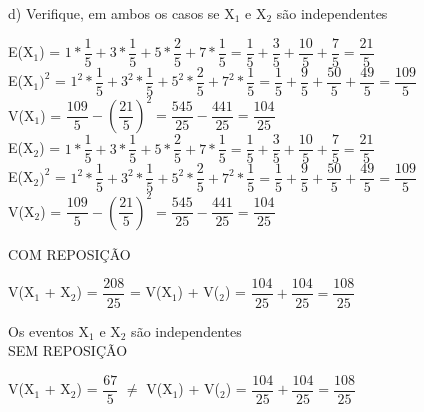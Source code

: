 \documentclass[12pt,a4paper,draft,final,oneside]{article}
\begin{document}
	\vspace{1cm}
	d) Verifique, em ambos os casos se X$_{1}$ e X$_{2}$ são independentes
	\vspace{0.5cm}\\
	\begin{center}
		E(X$_{1}$) = $1*\dfrac{1}{5} + 3*\dfrac{1}{5} + 5*\dfrac{2}{5} + 7*\dfrac{1}{5} = \dfrac{1}{5} + \dfrac{3}{5} + \dfrac{10}{5}
		+ \dfrac{7}{5} = \dfrac{21}{5}$
		\vspace{0.5cm}\\
		E(X$_{1})^2$ = $1^2*\dfrac{1}{5} + 3^2*\dfrac{1}{5} + 5^2*\dfrac{2}{5} + 7^2*\dfrac{1}{5} = \dfrac{1}{5} + \dfrac{9}{5} + \dfrac{50}{5} + \dfrac{49}{5} = \dfrac{109}{5}$
		\vspace{0.5cm}\\
		V(X$_{1}$) = $\dfrac{109}{5} - (\dfrac{21}{5})^2 = \dfrac{545}{25} - \dfrac{441}{25} = \dfrac{104}{25}$
		\vspace{1cm}\\
		E(X$_{2}$) = $1*\dfrac{1}{5} + 3*\dfrac{1}{5} + 5*\dfrac{2}{5} + 7*\dfrac{1}{5} = \dfrac{1}{5} + \dfrac{3}{5} + \dfrac{10}{5}
		+ \dfrac{7}{5} = \dfrac{21}{5}$
		\vspace{0.5cm}\\
		E(X$_{2})^2$ = $1^2*\dfrac{1}{5} + 3^2*\dfrac{1}{5} + 5^2*\dfrac{2}{5} + 7^2*\dfrac{1}{5} = \dfrac{1}{5} + \dfrac{9}{5} + \dfrac{50}{5} + \dfrac{49}{5} = \dfrac{109}{5}$
		\vspace{0.5cm}\\
		V(X$_{2}$) = $\dfrac{109}{5} - (\dfrac{21}{5})^2 = \dfrac{545}{25} - \dfrac{441}{25} = \dfrac{104}{25}$
		\vspace{1cm}\\
	\end{center}
	COM REPOSIÇÃO
	\vspace{0.5cm}\\
	\begin{center}
		V(X$_{1}$ + X$_{2}$) = $\dfrac{208}{25}$ =
		V(X$_{1}$) + V($_{2}$) = $\dfrac{104}{25} + \dfrac{104}{25} = \dfrac{108}{25}$
	\end{center}
	\vspace{0.5cm}
	Os eventos X$_{1}$ e X$_{2}$ são independentes
	\vspace{1cm}\\
	SEM REPOSIÇÃO
	\vspace{0.5cm}\\
	\begin{center}
		V(X$_{1}$ + X$_{2}$) = $\dfrac{67}{5}$ $\neq$
		V(X$_{1}$) + V($_{2}$) = $\dfrac{104}{25} + \dfrac{104}{25} = \dfrac{108}{25}$
	\end{center}
\end{document}
